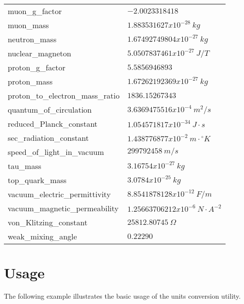\begin{longtable}{l|l}
muon\_g\_factor & $                      -2.0023318418 $ \\
muon\_mass & $                          1.883531627x10^{-28}\  kg $ \\
neutron\_mass & $                       1.67492749804x10^{-27}\  kg $ \\
nuclear\_magneton & $                   5.0507837461x10^{-27}\   J/T $ \\
proton\_g\_factor & $                    5.5856946893 $ \\
proton\_mass & $                        1.67262192369x10^{-27}\  kg $ \\
proton\_to\_electron\_mass\_ratio & $       1836.15267343 $ \\
quantum\_of\_circulation & $             3.6369475516x10^{-4}\  m^2/s $ \\
reduced\_Planck\_constant & $            1.054571817x10^{-34}\  J\cdot s $ \\
sec\_radiation\_constant & $             1.438776877x10^{-2}\  m\cdot {}^{\circ}K $ \\
speed\_of\_light\_in\_vacuum & $           299792458\ m/s $ \\
tau\_mass & $                           3.16754x10^{-27}\  kg $ \\
top\_quark\_mass & $                     3.0784x10^{-25}\  kg $ \\
vacuum\_electric\_permittivity & $       8.8541878128x10^{-12}\  F/m $ \\
vacuum\_magnetic\_permeability & $       1.25663706212x10^{-6}\  N\cdot A^{-2} $ \\
von\_Klitzing\_constant & $              25812.80745\ \Omega $ \\
weak\_mixing\_angle & $                  0.22290  $ \\
\end{longtable}



\section{Usage}

The following example illustrates the basic usage of the \aprepro{} units conversion utility.


